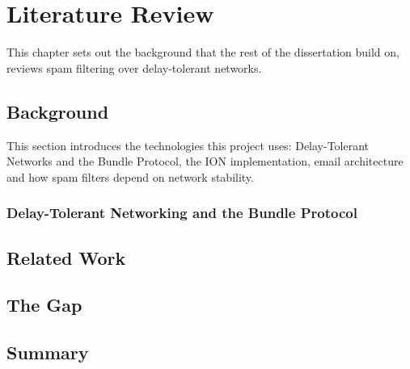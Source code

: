 \chapter{Literature Review}
\label{ch:literature}

This chapter sets out the background that the rest of the dissertation build on, reviews spam filtering over delay-tolerant networks.

\section{Background}
\label{sec:lit-background}

This section introduces the technologies this project uses: Delay-Tolerant Networks and the Bundle Protocol, the ION implementation, email architecture and how spam filters depend on network stability.

\subsection{Delay-Tolerant Networking and the Bundle Protocol}



\section{Related Work}

\section{The Gap}

\section{Summary}

